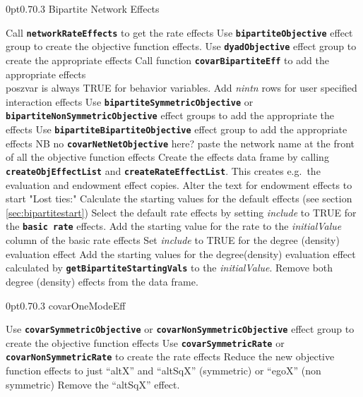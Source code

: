 \documentclass[12pt,a4paper]{article}
\makeatletter
\renewcommand{\=}{\,=\,}
\newcommand{\+}{\,+\,}
\newcommand{\nnm}[1]{\textsf{\small\textit{#1}}}
\renewcommand{\subsection}{\@startsection{subsection}{2}
                {0pt}{0.7\baselineskip}{0.3\baselineskip}
                {\sffamily} }
\newcommand{\sfn}[1]{\textbf{\texttt{#1}}}
\makeatother
\begin{document}
\subsection{Bipartite Network Effects}
\begin{algorithmic}
  \STATE Call \sfn{networkRateEffects} to get the rate effects
  \STATE Use \sfn{bipartiteObjective} effect group to create the objective
  function effects.
  \STATE Use \sfn{dyadObjective} effect group to create the appropriate effects
  \ENDFOR
  \STATE Call function \sfn{covarBipartiteEff} to add the appropriate effects\\
  poszvar is always TRUE for behavior variables.
  \ENDFOR
  \STATE Add \nnm{nintn} rows for user specified interaction effects
  \ENDIF
  \STATE Use \sfn{bipartiteSymmetricObjective} or
  \sfn{bipartiteNonSymmetricObjective} effect groups to add the appropriate
the effects
  \STATE Use \sfn{bipartiteBipartiteObjective} effect group to add the
  appropriate  effects
  \ENDIF
  \STATE NB no \sfn{covarNetNetObjective} here?
  \ENDFOR
  \STATE paste the network name at the front of all the objective function
  effects
  \ENDIF
  \STATE Create the effects data frame by calling \sfn{createObjEffectList} and
  \sfn{createRateEffectList}.  This creates e.g.\ the evaluation and endowment
  effect copies.
  \STATE Alter the text for endowment effects to start "Lost ties:"
  \STATE Calculate the starting values for the default effects
  (see section \ref{sec:bipartitestart})
  \STATE Select the default rate effects by setting \nnm{include} to TRUE for
  the \sfn{basic rate} effects.
  \STATE Add the starting value for the rate to the \nnm{initialValue} column
  of the basic rate effects
  \STATE  Set \nnm{include} to TRUE for the degree (density) evaluation effect
  \STATE Add the starting values for the degree(density) evaluation effect
  calculated by \sfn{getBipartiteStartingVals} to the \nnm{initialValue}.
  \ELSE
  \STATE Remove both degree (density) effects from the data frame.
  \ENDIF
\end{algorithmic}
\subsection{covarOneModeEff}
\begin{algorithmic}
\STATE Use \sfn{covarSymmetricObjective} or \sfn{covarNonSymmetricObjective}
effect group to create the objective function effects
\STATE Use \sfn{covarSymmetricRate} or \sfn{covarNonSymmetricRate} to create the
rate effects
\STATE Reduce the new objective function effects to just ``altX'' and ``altSqX'' (symmetric)
or ``egoX'' (non symmetric)
\ENDIF
{}
\STATE Remove the ``altSqX'' effect.
\ENDIF
\end{algorithmic}
\end{document}
